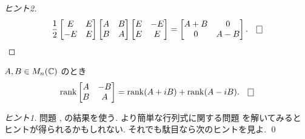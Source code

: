 \documentclass[12pt,twoside]{jarticle}
\begin{document}
\begin{proof}[ヒント2]
  \begin{equation*}
    \frac{1}{2}
    \begin{bmatrix}
       E & E \\
      -E & E \\
    \end{bmatrix}
    \begin{bmatrix}
      A & B \\
      B & A \\
    \end{bmatrix}
    \begin{bmatrix}
      E & -E \\
      E &  E \\
    \end{bmatrix}
    =
    \begin{bmatrix}
      A+B &  0  \\
       0  & A-B \\
    \end{bmatrix}.
    \qed
  \end{equation*}
\end{proof}


\begin{question}
  \label{q:rank-A-BBA}
  $A,B\in M_n({\mathbb C})$ のとき
  \begin{equation*}
    \rank
    \begin{bmatrix}
      A & -B \\
      B & A \\
    \end{bmatrix}
    = \rank(A+iB) + \rank(A-iB).
    \qed
  \end{equation*}
\end{question}

\begin{proof}[ヒント1]
  問題 ,  の結果を使う.
  より簡単な行列式に関する問題  を解いてみると
  ヒントが得られるかもしれない. それでも駄目なら次のヒントを見よ.
  \qed
\end{proof}
\end{document}
